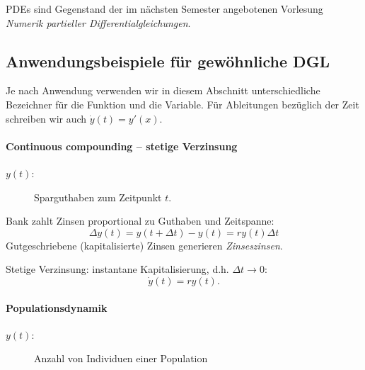 \documentclass[
]{mycourse}
\theoremstyle{mythm}
\theoremstyle{break}
\begin{document}
PDEs sind Gegenstand der im nächsten Semester angebotenen Vorlesung \emph{Numerik partieller Differentialgleichungen}.

\subsection{Anwendungsbeispiele für gewöhnliche DGL}

Je nach Anwendung verwenden wir in diesem Abschnitt unterschiedliche Bezeichner für die Funktion und
die Variable. Für Ableitungen bezüglich der Zeit schreiben wir auch 
$\dot y(t)=y'(x)$.

\paragraph{Continuous compounding -- stetige Verzinsung} 


\begin{description}
\item[$y(t)$:] Sparguthaben zum Zeitpunkt $t$.
\end{description}

Bank zahlt Zinsen proportional zu Guthaben und Zeitspanne:
\[
\Delta y(t)=y(t+\Delta t)-y(t)= r y(t) \Delta t
\]
Gutgeschriebene (kapitalisierte) Zinsen generieren \emph{Zinseszinsen}.

Stetige Verzinsung: instantane Kapitalisierung, d.h. $\Delta t\to 0$:
\[
\dot y(t)=r y(t).
\]


\paragraph{Populationsdynamik}

\begin{description}
\item[$y(t)$:] Anzahl von Individuen einer Population
\end{description}
\end{document}
